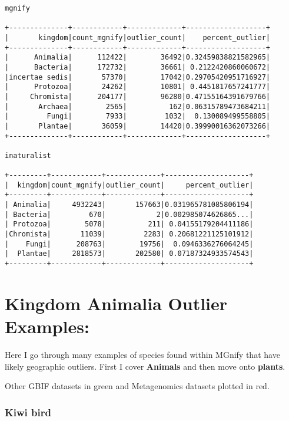 \documentclass[]{article}
\begin{document}
\begin{verbatim}
mgnify

+--------------+------------+-------------+-------------------+
|       kingdom|count_mgnify|outlier_count|    percent_outlier|
+--------------+------------+-------------+-------------------+
|      Animalia|      112422|        36492|0.32459838821582965|
|      Bacteria|      172732|        36661| 0.2122420860060672|
|incertae sedis|       57370|        17042|0.29705420951716927|
|      Protozoa|       24262|        10801| 0.4451817657241777|
|     Chromista|      204177|        96280|0.47155164391679766|
|       Archaea|        2565|          162|0.06315789473684211|
|         Fungi|        7933|         1032|  0.130089499558805|
|       Plantae|       36059|        14420|0.39990016362073266|
+--------------+------------+-------------+-------------------+

inaturalist

+---------+------------+-------------+--------------------+                     
|  kingdom|count_mgnify|outlier_count|     percent_outlier|
+---------+------------+-------------+--------------------+
| Animalia|     4932243|       157663|0.031965781085806194|
| Bacteria|         670|            2|0.002985074626865...|
| Protozoa|        5078|          211| 0.04155179204411186|
|Chromista|       11039|         2283| 0.20681221125101912|
|    Fungi|      208763|        19756|  0.0946336276064245|
|  Plantae|     2818573|       202580| 0.07187324933574543|
+---------+------------+-------------+--------------------+
\end{verbatim}

\hypertarget{kingdom-animalia-outlier-examples}{%
\section{Kingdom Animalia Outlier
Examples:}\label{kingdom-animalia-outlier-examples}}

Here I go through many examples of species found within MGnify that have
likely geographic outliers. First I cover \textbf{Animals} and then move
onto \textbf{plants}.

Other {GBIF datasets} in green and {Metagenomics datasets} plotted in
red.

\hypertarget{kiwi-bird}{%
\subsubsection{Kiwi bird}\label{kiwi-bird}}
\end{document}
